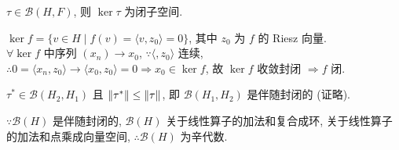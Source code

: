 \documentclass{note}
\begin{document}
\begin{cor}\label{cor-13.2}
    $\tau\in\mathcal{B}(H,F)$, 则 $\ker\tau$ 为闭子空间.
\end{cor}
\begin{pf}
    $\ker f=\{v\in H\mid f(v)=\langle v,z_0\rangle=0\}$, 其中 $z_0$ 为 $f$ 的 Riesz 向量.\\
    $\forall\ker f$ 中序列 $(x_n)\rightarrow x_0$, $\because\langle,z_0\rangle$ 连续, $\therefore 0=\langle x_n,z_0\rangle\rightarrow\langle x_0,z_0\rangle=0\Longrightarrow x_0\in\ker f$, 故 $\ker f$ 收敛封闭 $\Longrightarrow f$ 闭.
\end{pf}

$\tau^*\in\mathcal{B}(H_2,H_1)$ 且 $\left\lVert\tau^*\right\rVert\leq\left\lVert\tau\right\rVert$, 即 $\mathcal{B}(H_1,H_2)$ 是伴随封闭的 (证略).

$\because\mathcal{B}(H)$ 是伴随封闭的, $\mathcal{B}(H)$ 关于线性算子的加法和复合成环, 关于线性算子的加法和点乘成向量空间, $\therefore\mathcal{B}(H)$ 为辛代数.
\ifx\allfiles\undefined
\end{document}
